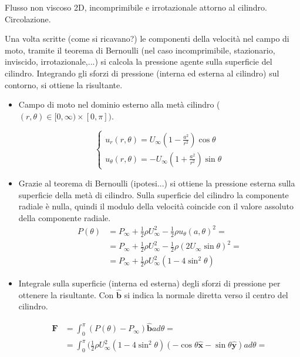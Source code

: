 \sol

\partone
 Flusso non viscoso 2D, incomprimibile e irrotazionale attorno al cilindro. Circolazione.

\parttwo
 Una volta scritte (come si ricavano?) le componenti della velocità nel campo di moto, tramite il teorema di Bernoulli (nel caso incomprimibile, stazionario, inviscido, irrotazionale,...) si calcola la pressione agente sulla superficie del cilindro. Integrando gli sforzi di pressione (interna ed esterna al cilindro) sul contorno, si ottiene la risultante.

\begin{itemize}

\item Campo di moto nel dominio esterno alla metà cilindro ($(r,\theta) \in [0,\infty)\times[0,\pi])$.

\begin{equation}
\begin{cases}
  u_r (r,\theta) = U_\infty \displaystyle \left(1 - \frac{a^2}{r^2}\right)\cos{\theta} \\
  u_\theta (r,\theta) = - U_\infty \displaystyle \left(1 + \frac{a^2}{r^2}\right)\sin{\theta}
\end{cases}
\end{equation}

\item Grazie al teorema di Bernoulli (ipotesi...) si ottiene la pressione esterna sulla superficie della metà di cilindro. Sulla superficie del cilindro la componente radiale è nulla, quindi il modulo della velocità coincide con il valore assoluto della componente radiale.
\begin{equation}
\begin{aligned}
  P(\theta) & = P_\infty + \frac{1}{2}\rho U_\infty^2 - \frac{1}{2}\rho u_\theta(a,\theta)^2 = \\
            & = P_\infty + \frac{1}{2}\rho U_\infty^2 - \frac{1}{2}\rho (2 U_\infty \sin{\theta})^2 = \\
            & = P_\infty + \frac{1}{2}\rho U_\infty^2 (1 - 4 \sin^2{\theta})
\end{aligned}
\end{equation}

\item Integrale sulla superficie (interna ed esterna) degli sforzi di pressione per ottenere la risultante. Con $\hat{\bm{b}}$ si indica la normale diretta verso il centro del cilindro.

\begin{equation}
\begin{aligned}
  \bm{F} & = \int_{0}^{\pi} (P(\theta)-P_\infty) \hat{\bm{b}} a d\theta = \\
      & = \int_{0}^{\pi} (\frac{1}{2}\rho U_\infty^2 (1 - 4 \sin^2{\theta}) (-\cos{\theta}\hat{\bm{x}} - \sin{\theta}\hat{\bm{y}}) a d\theta = \\
\end{aligned}
\end{equation}


\end{itemize}
